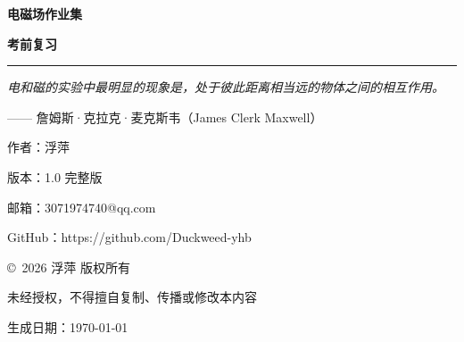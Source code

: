 \begin{titlepage}
    \centering
    \vspace*{2.5cm}
    
    {\Huge \bfseries 电磁场作业集 \par}
    \vspace{1cm}
    
    {\Large \bfseries 考前复习 \par}
    \vspace{0.8cm}
    
    \rule{\linewidth}{0.2mm}
    \vspace{1.5cm}
    
    {\itshape \large 电和磁的实验中最明显的现象是，处于彼此距离相当远的物体之间的相互作用。 \par}
    \vspace{0.5cm}
    {\large —— 詹姆斯·克拉克·麦克斯韦（James Clerk Maxwell） \par}
    \vspace{2cm}
    
    {\Large 作\quad 者：浮萍 \par}
    \vspace{0.4cm}
    {\Large 版\quad 本：1.0 完整版 \par}
    \vspace{0.4cm}
    {\Large 邮\quad 箱：3071974740@qq.com \par}
    \vspace{0.4cm}
    {\Large GitHub：https://github.com/Duckweed-yhb \par}
    \vspace{1.5cm}
    
    {\large \copyright\ 2026 浮萍 版权所有 \par}
    {\large 未经授权，不得擅自复制、传播或修改本内容 \par}
    \vspace{0.8cm}
    
    {\large 生成日期：\today \par}
\end{titlepage}
